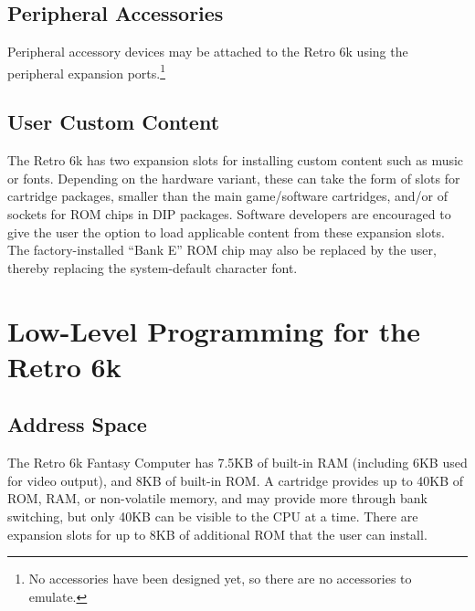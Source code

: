 \documentclass[12pt]{{memoir}}
\begin{document}
\section{Peripheral Accessories}

Peripheral accessory devices may be attached to the Retro 6k using the peripheral expansion ports.\footnote{No accessories have been designed yet, so there are no accessories to emulate.}

\section{User Custom Content}

The Retro 6k has two expansion slots for installing custom content such as music or fonts. Depending on the hardware variant, these can take the form of slots for cartridge packages, smaller than the main game/software cartridges, and/or of sockets for ROM chips in DIP packages. Software developers are encouraged to give the user the option to load applicable content from these expansion slots. The factory-installed ``Bank E'' ROM chip may also be replaced by the user, thereby replacing the system-default character font.

\chapter{Low-Level Programming for the Retro 6k}
\section{Address Space}

The Retro 6k Fantasy Computer has 7.5KB of built-in RAM (including 6KB used for video output), and 8KB of built-in ROM. A cartridge provides up to 40KB of ROM, RAM, or non-volatile memory, and may provide more through bank switching, but only 40KB can be visible to the CPU at a time. There are expansion slots for up to 8KB of additional ROM that the user can install.
\end{document}
